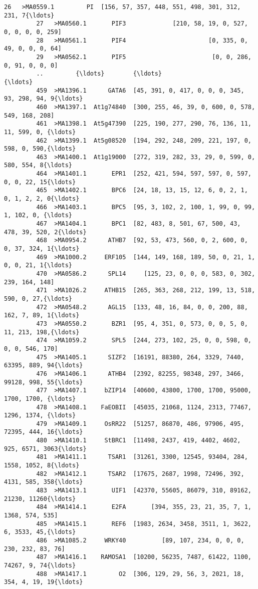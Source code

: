 \documentclass[11pt]{article}
\begin{document}
\begin{Verbatim}[commandchars=\\\{\}]
         26   >MA0559.1         PI  [156, 57, 357, 448, 551, 498, 301, 312, 231, 7{\ldots}   
         27   >MA0560.1       PIF3             [210, 58, 19, 0, 527, 0, 0, 0, 0, 259]   
         28   >MA0561.1       PIF4                       [0, 335, 0, 49, 0, 0, 0, 64]   
         29   >MA0562.1       PIF5                        [0, 0, 286, 0, 91, 0, 0, 0]   
         ..         {\ldots}        {\ldots}                                                {\ldots}   
         459  >MA1396.1      GATA6  [45, 391, 0, 417, 0, 0, 0, 345, 93, 298, 94, 9{\ldots}   
         460  >MA1397.1  At1g74840  [300, 255, 46, 39, 0, 600, 0, 578, 549, 168, 208]   
         461  >MA1398.1  At5g47390  [225, 190, 277, 290, 76, 136, 11, 11, 599, 0, {\ldots}   
         462  >MA1399.1  At5g08520  [194, 292, 248, 209, 221, 197, 0, 598, 0, 590,{\ldots}   
         463  >MA1400.1  At1g19000  [272, 319, 282, 33, 29, 0, 599, 0, 580, 554, 8{\ldots}   
         464  >MA1401.1       EPR1  [252, 421, 594, 597, 597, 0, 597, 0, 0, 22, 15{\ldots}   
         465  >MA1402.1       BPC6  [24, 18, 13, 15, 12, 6, 0, 2, 1, 0, 1, 2, 2, 0{\ldots}   
         466  >MA1403.1       BPC5  [95, 3, 102, 2, 100, 1, 99, 0, 99, 1, 102, 0, {\ldots}   
         467  >MA1404.1       BPC1  [82, 483, 8, 501, 67, 500, 43, 478, 39, 520, 2{\ldots}   
         468  >MA0954.2      ATHB7  [92, 53, 473, 560, 0, 2, 600, 0, 0, 37, 324, 1{\ldots}   
         469  >MA1000.2     ERF105  [144, 149, 168, 189, 50, 0, 21, 1, 0, 0, 21, 1{\ldots}   
         470  >MA0586.2      SPL14     [125, 23, 0, 0, 0, 583, 0, 302, 239, 164, 148]   
         471  >MA1026.2     ATHB15  [265, 363, 268, 212, 199, 13, 518, 590, 0, 27,{\ldots}   
         472  >MA0548.2      AGL15  [133, 48, 16, 84, 0, 0, 200, 88, 162, 7, 89, 1{\ldots}   
         473  >MA0550.2       BZR1  [95, 4, 351, 0, 573, 0, 0, 5, 0, 11, 213, 198,{\ldots}   
         474  >MA1059.2       SPL5  [244, 273, 102, 25, 0, 0, 598, 0, 0, 0, 546, 170]   
         475  >MA1405.1      SIZF2  [16191, 88380, 264, 3329, 7440, 63395, 889, 94{\ldots}   
         476  >MA1406.1      ATHB4  [2392, 82255, 98348, 297, 3466, 99128, 998, 55{\ldots}   
         477  >MA1407.1     bZIP14  [40600, 43800, 1700, 1700, 95000, 1700, 1700, {\ldots}   
         478  >MA1408.1    FaEOBII  [45035, 21068, 1124, 2313, 77467, 1296, 1374, {\ldots}   
         479  >MA1409.1     OsRR22  [51257, 86870, 486, 97906, 495, 72395, 444, 16{\ldots}   
         480  >MA1410.1     StBRC1  [11498, 2437, 419, 4402, 4602, 925, 6571, 3063{\ldots}   
         481  >MA1411.1      TSAR1  [31261, 3300, 12545, 93404, 284, 1558, 1052, 8{\ldots}   
         482  >MA1412.1      TSAR2  [17675, 2687, 1998, 72496, 392, 4131, 585, 358{\ldots}   
         483  >MA1413.1       UIF1  [42370, 55605, 86079, 310, 89162, 21230, 11260{\ldots}   
         484  >MA1414.1       E2FA       [394, 355, 23, 21, 35, 7, 1, 1368, 574, 535]   
         485  >MA1415.1       REF6  [1983, 2634, 3458, 3511, 1, 3622, 6, 3533, 45,{\ldots}   
         486  >MA1085.2     WRKY40          [89, 107, 234, 0, 0, 0, 230, 232, 83, 76]   
         487  >MA1416.1    RAMOSA1  [10200, 56235, 7487, 61422, 1100, 74267, 9, 74{\ldots}   
         488  >MA1417.1         O2  [306, 129, 29, 56, 3, 2021, 18, 354, 4, 19, 19{\ldots}   
         

\end{Verbatim}
\end{document}
